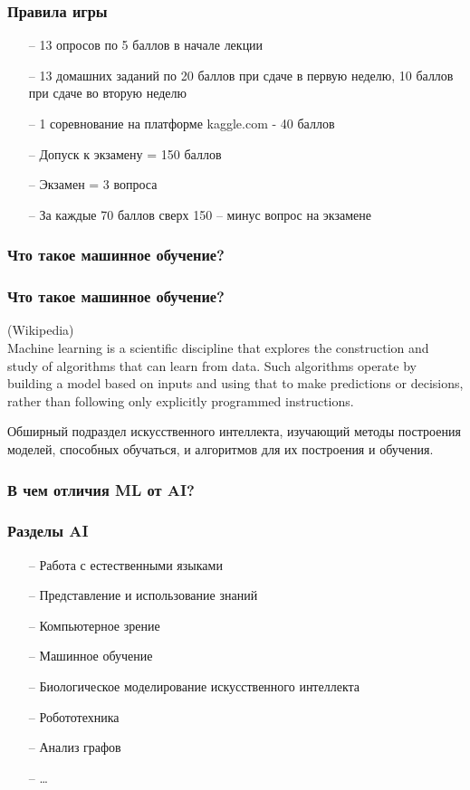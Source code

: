 \documentclass[12pt]{beamer}
\subtitle{Лекция 1}
\begin{document}
\frame{\titlepage}

\begin{frame}\frametitle{Правила игры}
\begin{itemize}
  \item[--] 13 опросов по 5 баллов в начале лекции
  \item[--] 13 домашних заданий по 20 баллов при сдаче в первую неделю, 
  10 баллов при сдаче во вторую неделю
  \item[--] 1 соревнование на платформе kaggle.com - 40 баллов
  \vspace{5mm}
  \item[--] Допуск к экзамену = 150 баллов
  \item[--] Экзамен = 3 вопроса
  \item[--] За каждые 70 баллов сверх 150 -- минус вопрос на экзамене
\end{itemize}
\end{frame}

\begin{frame}\frametitle{Что такое машинное обучение?}
\end{frame}

\begin{frame}\frametitle{Что такое машинное обучение?}
(Wikipedia)\\
Machine learning is a scientific discipline that explores the construction and study of algorithms that can learn from data. Such algorithms operate by building a model based on inputs and using that to make predictions or decisions, rather than following only explicitly programmed instructions. 
\vspace{5mm}

Обширный подраздел искусственного интеллекта, изучающий методы построения моделей, способных обучаться, и алгоритмов для их построения и обучения.\\

\end{frame}

\begin{frame}\frametitle{В чем отличия ML от AI?}
\end{frame}

\begin{frame}\frametitle{Разделы AI}
\begin{itemize}
  \item[--] Работа с естественными языками
\item[--] Представление и использование знаний
\item[--] Компьютерное зрение
\item[--] Машинное обучение
\item[--] Биологическое моделирование искусственного интеллекта
\item[--] Робототехника
\item[--] Анализ графов
\item[--] \ldots
\end{itemize}
\end{frame}
\end{document}
